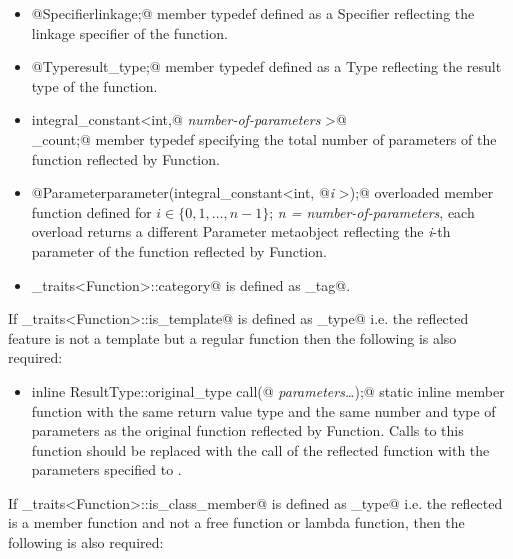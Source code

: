 \begin{itemize}
	\item{\verb@typedef @{\metaobject Specifier}\verb@ linkage;@} member typedef defined as 
	a {\metaobject Specifier} reflecting the linkage specifier of the function.

	\item{\verb@typedef @{\metaobject Type}\verb@ result_type;@} member typedef defined as
	a {\metaobject Type} reflecting the result type of the function.

	\item{\verb@typedef integral_constant<int,@ {\em number-of-parameters}
	\verb@>@\\\verb@parameter_count;@} member typedef specifying the total number
	of parameters of the function reflected by {\metaobject Function}.

	\item{\verb@static @{\metaobject Parameter}\verb@ parameter(integral_constant<int, @{\em i}
	\verb@>);@} overloaded member function defined
	for $i \in \{0, 1, \dots, n-1\}$; {\em n = number-of-parameters},
	each overload returns a different {\metaobject Parameter} metaobject reflecting the {\em i}-th parameter
	of the function reflected by {\metaobject Function}.

	\item \verb@metaobject_traits<Function>::category@ is defined as \verb@function_tag@.
\end{itemize}

If \verb@metaobject_traits<Function>::is_template@ is defined as \verb@false_type@
i.e. the reflected feature is not a template but a regular function then the following is also
required:

\begin{itemize}
	\item{\verb@static inline ResultType::original_type call(@ {\em parameters\dots}\verb@);@}
	static inline member function with the same return value type and the same number
	and type of parameters as the original function reflected by {\metaobject Function}.
	Calls to this function should be replaced with the call of the reflected function
	with the parameters specified to \verb@call@.
\end{itemize}

If \verb@metaobject_traits<Function>::is_class_member@ is defined as \verb@true_type@
i.e. the reflected is a member function and not a free function or lambda function,
then the following is also required:

